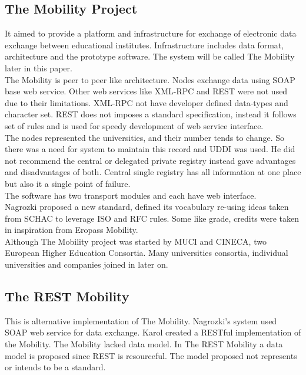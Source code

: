 \documentclass[12pt,a4paper,oneside]{book}
\begin{document}
    \subsection{The Mobility Project}
    It aimed to provide a platform and infrastructure for exchange of electronic data exchange between educational institutes. Infrastructure includes data format, architecture and the prototype software. The system will be called The Mobility later in this paper. \\

    The Mobility is peer to peer like architecture. Nodes exchange data using SOAP base web service. Other web services like XML-RPC and REST were not used due to their limitations. XML-RPC not have developer defined data-types and character set. REST does not imposes a standard specification, instead it follows set of rules and is used for speedy development of web service interface. \\

    The nodes represented the universities, and their number tends to change. So there was a need for system to maintain this record and UDDI was used. He did not recommend the central or delegated private registry instead gave advantages and disadvantages of both. Central single registry has all information at one place but also it a single point of failure. \\

    The software has two transport modules and each have web interface. \\

    Nagrozki proposed a new standard, defined its vocabulary re-using ideas taken from SCHAC to leverage ISO and RFC rules. Some like grade, credits were taken in inspiration from Eropass Mobility. \\

    Although The Mobility project was started by MUCI and CINECA, two European Higher Education Consortia. Many universities consortia, individual universities and companies joined in later on. \\

    \subsection{The REST Mobility}
    This is alternative implementation of The Mobility. Nagrozki's system used SOAP web service for data exchange. Karol created a RESTful implementation of the Mobility. The Mobility lacked data model. In The REST Mobility a data model is proposed since REST is resourceful. The model proposed not represents or intends to be a standard. \\
\end{document}
